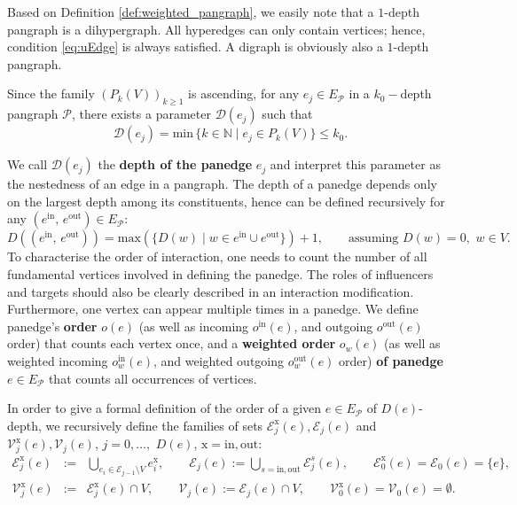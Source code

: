 \documentclass[a4paper,12pt]{article}
\theoremstyle{definition}
\theoremstyle{remark}
\newcommand{\D}{\mathcal{D}}
\newcommand{\mP}{\mathcal{P}}
\newcommand{\EP}{E_{\mathcal{P}}}
\newcommand{\tin}{\mathrm{in}}
\newcommand{\out}{\mathrm{out}}
\begin{document}
Based on Definition \ref{def:weighted_pangraph}, we easily note that a $1$-depth pangraph is a dihypergraph. All hyperedges can only contain vertices; hence, condition \eqref{eq:uEdge} is always satisfied. A digraph is obviously also a $1$-depth pangraph.\newline

Since the family $(P_k(V))_{k\geq 1}$ is ascending, for any $e_j\in \EP$ in a $k_0-$depth pangraph $\mP$, there exists a parameter $\D(e_j)$ such that
\begin{equation}
        \mathcal{D}(e_j)=\text{min}\,\{k \in \mathbb{N}\;|\; e_j \in P_{k}(V)\}\leq k_0.
    \end{equation}
    
We call $\D(e_j)$ the \textbf{depth of the panedge} $e_j$ and interpret this parameter as the nestedness of an edge in a pangraph. The depth of a panedge depends only on the largest depth among its constituents, hence can be defined recursively for any $(e^{\tin},\, e^{\out})\in E_{\mP}$:
    \begin{equation}\label{eq:recursive_depth}
        D((e^{\tin},\, e^{\out}))=\text{max}(\{D(w)\;|\; w \in e^{\tin}\cup e^{\out} \} )+1, \qquad \text{assuming}\,\, D(w)=0,\,\, w\in V. 
    \end{equation}
To characterise the order of interaction, one needs to count the number of all fundamental vertices involved in defining the panedge. The roles of influencers and targets should also be clearly described in an interaction modification. Furthermore, one vertex can appear multiple times in a panedge. We define panedge's \textbf{order} $o(e)$ (as well as incoming $o^{\tin}(e)$, and outgoing $o^{\out}(e)$ order) that counts each vertex once, and a \textbf{weighted order} $o_w(e)$ (as well as weighted incoming $o^{\tin}_w(e)$, and weighted outgoing $o^{\out}_w(e)$ order) \textbf{of panedge} $e\in E_\mP$ that counts all occurrences of vertices.

In order to give a formal definition of the order of a given $e\in E_\mP$ of $D(e)$-depth, we recursively define the families of sets  
$\mathcal{E}^\textrm{x}_j(e), \mathcal{E}_j(e)$ and $\mathcal{V}^\textrm{x}_j(e),\mathcal{V}_j(e)$, $j=0,\ldots,$ $D(e)$, $\textrm{x}=\tin,\out$: 
\begin{eqnarray}\nonumber
\mathcal{E}_j^\textrm{x}(e)&:=&\bigcup_{e_i\in \mathcal{E}_{j-1}\setminus V}e_i^\textrm{x},\qquad \mathcal{E}_j(e):=\bigcup_{s=\tin,\out}\mathcal{E}_j^s(e),\qquad \mathcal{E}^\textrm{x}_0(e)=\mathcal{E}_0(e)=\{e\},\\ \label{eq:v}
\mathcal{V}^\textrm{x}_j(e)&:=&\mathcal{E}^\textrm{x}_j(e)\cap V,\qquad \mathcal{V}_j(e):=\mathcal{E}_j(e)\cap V,\qquad \mathcal{V}^\textrm{x}_0(e)=\mathcal{V}_0(e)=\emptyset.
\end{eqnarray}
\end{document}
